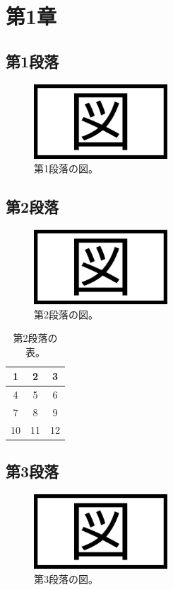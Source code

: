 \documentclass[a4paper, platex, dvipdfmx]{jsarticle}
\begin{document}
\section{第1章}
\subsection{第1段落}
\lipsum[1]

\begin{figure}[H]
  \centering
  \includegraphics[width=5cm]{sample.png}
  \caption{第1段落の図。}
\end{figure}

\subsection{第2段落}
\lipsum[2]

\begin{figure}[H]
  \centering
  \includegraphics[width=5cm]{sample.png}
  \caption{第2段落の図。}
\end{figure}

\begin{table}[H]
  \centering
  \caption{第2段落の表。}
  \begin{tabular}{ccc}
    \hline
    1 & 2 & 3 \\\hline
    4 & 5 & 6\\
    7 & 8 & 9 \\
    10 & 11 & 12 \\\hline
  \end{tabular}
\end{table}

\subsection{第3段落}
\lipsum[3]

\begin{figure}[H]
  \centering
  \includegraphics[width=5cm]{sample.png}
  \caption{第3段落の図。}
\end{figure}
\end{document}

